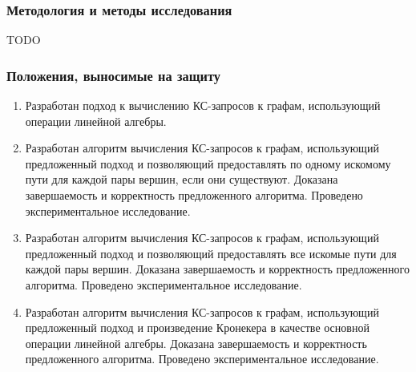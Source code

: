 \subsubsection*{\large{Методология и методы исследования}}
TODO



\subsubsection*{\large{Положения, выносимые на защиту}}
\begin{enumerate}
	\item Разработан подход к вычислению КС-запросов к графам, использующий операции линейной алгебры.
	\item Разработан алгоритм вычисления КС-запросов к графам, использующий предложенный подход и позволяющий предоставлять по одному искомому пути для каждой пары вершин, если они существуют. Доказана завершаемость и корректность предложенного алгоритма. Проведено экспериментальное исследование.
	\item Разработан алгоритм вычисления КС-запросов к графам, использующий предложенный подход и позволяющий предоставлять все искомые пути для каждой пары вершин. Доказана завершаемость и корректность предложенного алгоритма. Проведено экспериментальное исследование.
	\item Разработан алгоритм вычисления КС-запросов к графам, использующий предложенный подход и произведение Кронекера в качестве основной операции линейной алгебры. Доказана завершаемость и корректность предложенного алгоритма. Проведено экспериментальное исследование.
\end{enumerate}


